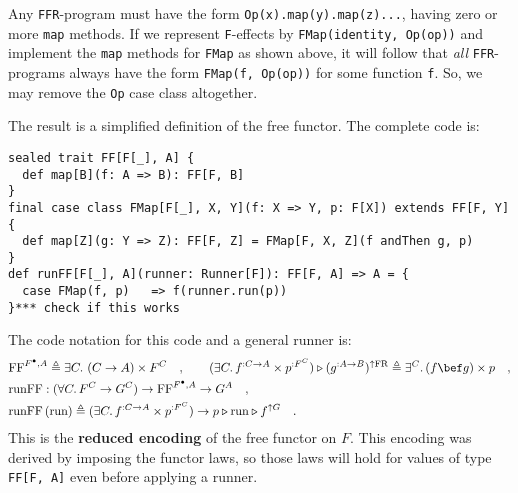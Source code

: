 Any \lstinline!FFR!-program
must have the form \lstinline!Op(x).map(y).map(z)...!,
having zero or more \lstinline!map!
methods. If we represent \lstinline!F!-effects
by \lstinline!FMap(identity, Op(op))!
and implement the \lstinline!map!
methods for \lstinline!FMap!
as shown above, it will follow that \emph{all} \lstinline!FFR!-programs
always have the form \lstinline!FMap(f, Op(op))!
for some function \lstinline!f!.
So, we may remove the \lstinline!Op!
case class altogether.

The result is a simplified definition of the free functor. The complete
code is:
\begin{lstlisting}
sealed trait FF[F[_], A] {
  def map[B](f: A => B): FF[F, B]
}
final case class FMap[F[_], X, Y](f: X => Y, p: F[X]) extends FF[F, Y] {
  def map[Z](g: Y => Z): FF[F, Z] = FMap[F, X, Z](f andThen g, p)
}
def runFF[F[_], A](runner: Runner[F]): FF[F, A] => A = {
  case FMap(f, p)   => f(runner.run(p))
}*** check if this works
\end{lstlisting}
The code notation for this code and a general runner is:
\begin{align*}
 & \text{FF}^{F^{\bullet},A}\triangleq\exists C.\,\left(C\rightarrow A\right)\times F^{C}\quad,\quad\quad(\exists C.\,f^{:C\rightarrow A}\times p^{:F^{C}})\triangleright(g^{:A\rightarrow B})^{\uparrow\text{FR}}\triangleq\exists^{C}.\,(f\bef g)\times p\quad,\\
 & \text{runFF}:(\forall C.\,F^{C}\rightarrow G^{C})\rightarrow\text{FF}^{F^{\bullet},A}\rightarrow G^{A}\quad,\\
 & \text{runFF}\,(\text{run})\triangleq(\exists C.\,f^{:C\rightarrow A}\times p^{:F^{C}})\rightarrow p\triangleright\text{run}\triangleright f^{\uparrow G}\quad.
\end{align*}
This is the \textbf{reduced encoding}
of the free functor on $F$. This encoding was derived by imposing
the functor laws, so those laws will hold for values of type \lstinline!FF[F, A]!
even before applying a runner.

